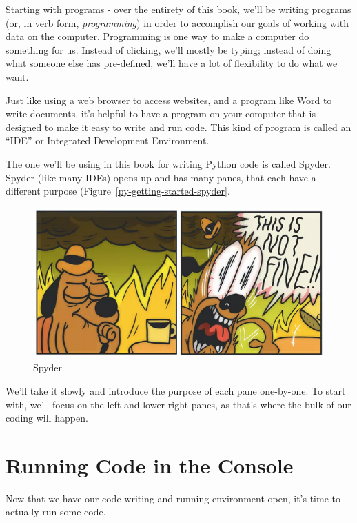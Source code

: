 \documentclass[]{Nemilov}
\begin{document}
Starting with programs - over the entirety of this book, we'll be writing
programs (or, in verb form, \emph{programming}) in order to accomplish our goals
of working with data on the computer.
Programming is one way to make a computer do something for us.
Instead of clicking, we'll mostly be typing; instead of doing
what someone else has pre-defined, we'll have a lot of flexibility to
do what we want.

Just like using a web browser to access websites, and a program like
Word to write documents, it's helpful to have a program on your computer
that is designed to make it easy to write and run code. This kind of program
is called an ``IDE'' or Integrated Development Environment.

The one we'll be using in this book for writing Python code is called Spyder.
Spyder (like many IDEs) opens up and has many panes, that each have a different
purpose (Figure~\ref{py-getting-started-spyder}.

\begin{figure}
\centering
\includegraphics{figures/FIXME.png}
\caption{\label{fig:py-getting-started-spyder}Spyder}
\end{figure}

We'll take it slowly and introduce the purpose of each pane one-by-one.
To start with, we'll focus on the left and lower-right panes, as that's
where the bulk of our coding will happen.

\hypertarget{py-getting-started-console}{%
\section{Running Code in the Console}\label{py-getting-started-console}}

Now that we have our code-writing-and-running environment open, it's time to
actually run some code.
\end{document}
